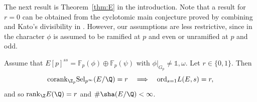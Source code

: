 The next result is Theorem~\ref{thm:E} in the introduction.
Note that a result for $r=0$ can be obtained from the cyclotomic main conjecture proved by combining \cite[Thm.~1.3]{greenvats} and Kato's divisibility in \cite{kato-euler-systems}. However, our assumptions are less restrictive, since in \cite{greenvats} the character $\phi$ is assumed to be ramified at $p$ and even or unramified at $p$ and odd.
\begin{theorem}
\notready\label{thm:thmB}
Assume that $E[p]^{ss}=\mathbb{F}_p(\phi)\oplus\mathbb{F}_p(\psi)$ with $\phi\vert_{G_p}\neq\mathds{1},\omega$. Let $r\in\{0,1\}$. Then
\[
{\rm corank}_{\Z_p}{\rm Sel}_{p^\infty}(E/\Q) = r
\quad\Longrightarrow\quad
{\rm ord}_{s=1}L(E,s)=r,
\]
and so ${\rm rank}_\Z E(\Q)=r$ and $\#\sha(E/\Q)<\infty$.
\end{theorem}

